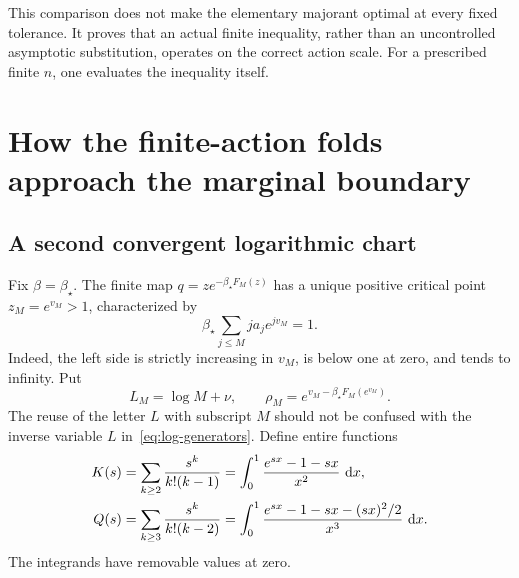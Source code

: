 \documentclass[11pt,a4paper]{article}
\numberwithin{equation}{section}
\theoremstyle{definition}
\theoremstyle{remark}
\newcommand{\dd}{\,\mathrm d}
\newcommand{\bs}{\beta_\star}
\begin{document}
This comparison does not make the elementary majorant optimal at every
fixed tolerance. It proves that an actual finite inequality, rather than an
uncontrolled asymptotic substitution, operates on the correct action scale.
For a prescribed finite \(n\), one evaluates the inequality itself.

\section{How the finite-action folds approach the marginal boundary}
\label{sec:fold}

\subsection{A second convergent logarithmic chart}
Fix \(\beta=\bs\). The finite map
\(q=z e^{-\bs F_M(z)}\) has a unique positive critical point
\(z_M=e^{v_M}>1\), characterized by
\begin{equation}
 \bs\sum_{j\le M}j a_j e^{jv_M}=1.
 \label{eq:finite-fold-equation}
\end{equation}
Indeed, the left side is strictly increasing in \(v_M\), is below one at
zero, and tends to infinity. Put
\[
 L_M=\log M+\nu,\qquad \rho_M=e^{v_M-\bs F_M(e^{v_M})}.
\]
The reuse of the letter \(L\) with subscript \(M\) should not be confused
with the inverse variable \(L\) in~\eqref{eq:log-generators}.
Define entire functions
\begin{align}
 K(s)&=\sum_{k\ge2}\frac{s^k}{k!(k-1)}
 =\int_0^1\frac{e^{sx}-1-sx}{x^2}\,\dd x,\notag\\
 Q(s)&=\sum_{k\ge3}\frac{s^k}{k!(k-2)}
 =\int_0^1\frac{e^{sx}-1-sx-(sx)^2/2}{x^3}\,\dd x.
 \label{eq:KQ}
\end{align}
The integrands have removable values at zero.
\end{document}
